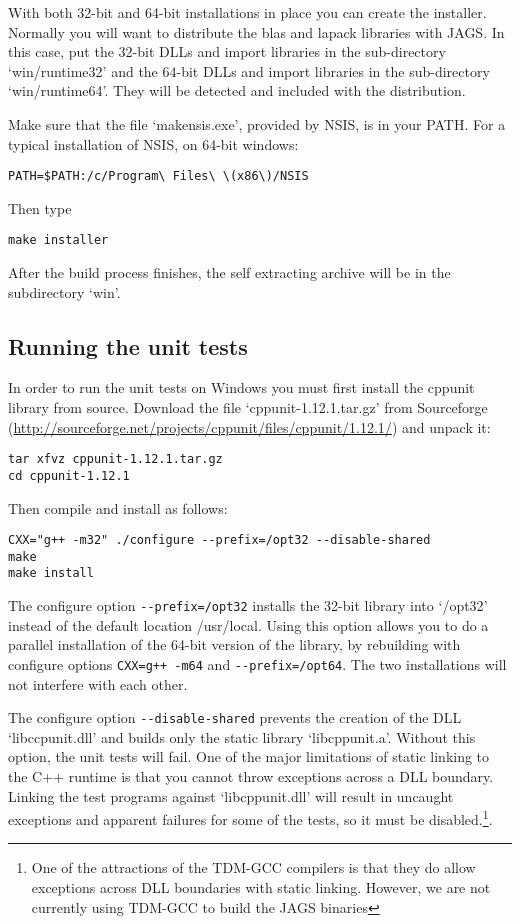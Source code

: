 \documentclass[11pt, a4paper, titlepage]{article}
\newcommand{\file}[1]{{`\normalfont\textsf{#1}'}}
\begin{document}
With both 32-bit and 64-bit installations in place you can create the
installer.  Normally you will want to distribute the blas and lapack
libraries with JAGS.  In this case, put the 32-bit DLLs and import
libraries in the sub-directory \file{win/runtime32} and the 64-bit
DLLs and import libraries in the sub-directory
\file{win/runtime64}. They will be detected and included with the
distribution.

Make sure that the file \file{makensis.exe}, provided by
NSIS, is in your PATH. For a typical installation of NSIS, on 64-bit
windows:
\begin{verbatim}
PATH=$PATH:/c/Program\ Files\ \(x86\)/NSIS
\end{verbatim}
Then type
\begin{verbatim}
make installer
\end{verbatim}
After the build process finishes, the self extracting archive will be
in the subdirectory \file{win}.

\subsection{Running the unit tests}

In order to run the unit tests on Windows you must first install the
cppunit library from source. Download the file \file{cppunit-1.12.1.tar.gz}
from Sourceforge (\url{http://sourceforge.net/projects/cppunit/files/cppunit/1.12.1/}) and
unpack it:
\begin{verbatim}
tar xfvz cppunit-1.12.1.tar.gz
cd cppunit-1.12.1
\end{verbatim}
Then compile and install as follows:
\begin{verbatim}
CXX="g++ -m32" ./configure --prefix=/opt32 --disable-shared
make
make install
\end{verbatim}
The configure option \verb+--prefix=/opt32+ installs the 32-bit
library into \file{/opt32} instead of the default location
{/usr/local}. Using this option allows you to do a parallel
installation of the 64-bit version of the library, by rebuilding with
configure options \verb|CXX=g++ -m64| and \verb+--prefix=/opt64+. The two
installations will not interfere with each other.

The configure option \verb+--disable-shared+ prevents the creation of
the DLL \file{libccpunit.dll} and builds only the static library
\file{libcppunit.a}. Without this option, the unit tests will fail.
One of the major limitations of static linking to the C++ runtime is
that you cannot throw exceptions across a DLL boundary.  Linking the
test programs against \file{libcppunit.dll} will result in uncaught
exceptions and apparent failures for some of the tests, so it must be
disabled.\footnote{One of the attractions of the TDM-GCC compilers is
  that they do allow exceptions across DLL boundaries with static
  linking. However, we are not currently using TDM-GCC to build the
  JAGS binaries}.
\end{document}
